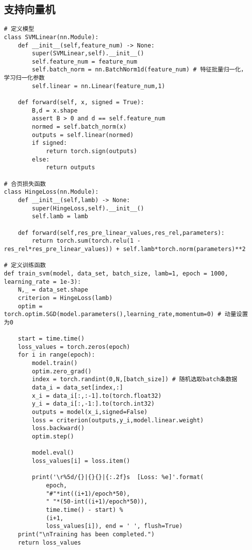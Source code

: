 \subsection{支持向量机}

\begin{lstlisting}[caption={线性支持向量机}]
# 定义模型
class SVMLinear(nn.Module):
    def __init__(self,feature_num) -> None:
        super(SVMLinear,self).__init__()
        self.feature_num = feature_num
        self.batch_norm = nn.BatchNorm1d(feature_num) # 特征批量归一化，学习归一化参数
        self.linear = nn.Linear(feature_num,1)
    
    def forward(self, x, signed = True):
        B,d = x.shape
        assert B > 0 and d == self.feature_num
        normed = self.batch_norm(x)
        outputs = self.linear(normed)
        if signed:
            return torch.sign(outputs)
        else:
            return outputs

# 合页损失函数
class HingeLoss(nn.Module):
    def __init__(self,lamb) -> None:
        super(HingeLoss,self).__init__()
        self.lamb = lamb

    def forward(self,res_pre_linear_values,res_rel,parameters):
        return torch.sum(torch.relu(1 - res_rel*res_pre_linear_values)) + self.lamb*torch.norm(parameters)**2

# 定义训练函数
def train_svm(model, data_set, batch_size, lamb=1, epoch = 1000, learning_rate = 1e-3):
    N,_ = data_set.shape
    criterion = HingeLoss(lamb)
    optim = torch.optim.SGD(model.parameters(),learning_rate,momentum=0) # 动量设置为0
    
    start = time.time()
    loss_values = torch.zeros(epoch)
    for i in range(epoch):
        model.train()
        optim.zero_grad()
        index = torch.randint(0,N,[batch_size]) # 随机选取batch条数据
        data_i = data_set[index,:]
        x_i = data_i[:,:-1].to(torch.float32)
        y_i = data_i[:,-1:].to(torch.int32)
        outputs = model(x_i,signed=False)
        loss = criterion(outputs,y_i,model.linear.weight)
        loss.backward()
        optim.step()

        model.eval()
        loss_values[i] = loss.item()

        print('\r%5d/{}|{}{}|{:.2f}s  [Loss: %e]'.format(
            epoch,
            "#"*int((i+1)/epoch*50),
            " "*(50-int((i+1)/epoch*50)),
            time.time() - start) %
            (i+1,
            loss_values[i]), end = ' ', flush=True)
    print("\nTraining has been completed.")
    return loss_values
\end{lstlisting}

